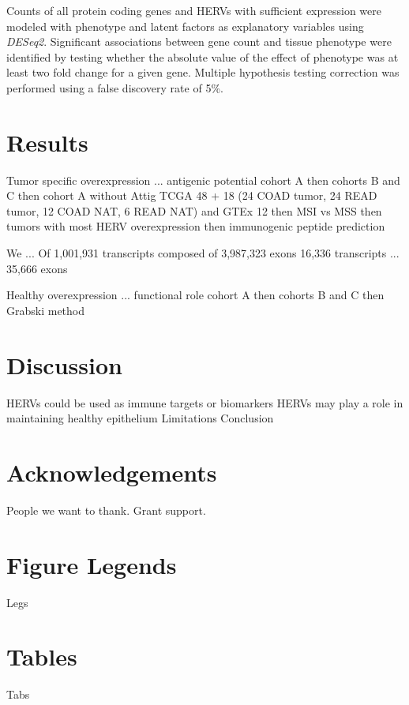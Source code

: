 \documentclass[10pt,letterpaper]{article}
\begin{document}
Counts of all protein coding genes and HERVs with sufficient expression were modeled with phenotype and latent factors as explanatory variables using \emph{DESeq2}.
Significant associations between gene count and tissue phenotype were identified by testing whether the absolute value of the effect of phenotype was at least two fold change for a given gene.
Multiple hypothesis testing correction was performed using a false discovery rate of 5\%.

\section*{Results}

Tumor specific overexpression ... antigenic potential
cohort A
then cohorts B and C
then cohort A without Attig TCGA 48 + 18 (24 COAD tumor, 24 READ tumor, 12 COAD NAT, 6 READ NAT) and GTEx 12
then MSI vs MSS
then tumors with most HERV overexpression
then immunogenic peptide prediction

We ...
Of 1,001,931 transcripts composed of 3,987,323 exons 16,336 transcripts ... 35,666 exons

Healthy overexpression ... functional role
cohort A
then cohorts B and C
then Grabski method

\section*{Discussion}

HERVs could be used as immune targets or biomarkers
HERVs may play a role in maintaining healthy epithelium
Limitations
Conclusion

\section*{Acknowledgements}

People we want to thank. Grant support.




\section*{Figure Legends}

Legs

\section*{Tables}

Tabs
\end{document}
